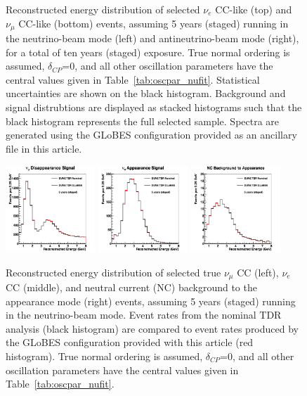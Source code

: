 \documentclass[aps,prd,superscriptaddress]{revtex4-1}
\newcommand{\nue}{\mbox{$\nu_e$}}
\newcommand{\numu}{\mbox{$\nu_{\mu}$}}
\newcommand{\dcp}{\mbox{$\delta_{CP}$}}
\begin{document}
\begin{figure}[!htpb]
  \caption{Reconstructed energy distribution of selected $\nue$ CC-like (top) and $\numu$ CC-like (bottom) events,
    assuming 5 years (staged) running in the neutrino-beam mode (left) and antineutrino-beam mode (right), for a
    total of ten years (staged) exposure. True normal ordering is assumed, $\dcp$=0, and all other oscillation
    parameters have the central values given in Table~\ref{tab:oscpar_nufit}.
    Statistical uncertainties are shown on the black histogram.
    Background and signal
    distrubtions are displayed as stacked histograms such that the black histogram represents the full selected
    sample.
    Spectra are
    generated using the GLoBES configuration provided as an ancillary file in this article. }
  \label{fig:spectra}
\end{figure}

\begin{figure}[!htpb]
  \centering
  \includegraphics[width=0.3\textwidth]{spec_checkscale_numu.png}
  \includegraphics[width=0.3\textwidth]{spec_checkscale_nue.png}
  \includegraphics[width=0.3\textwidth]{spec_checkscale_ncbg.png}
  \caption{Reconstructed energy distribution of selected true $\numu$ CC (left), $\nue$ CC (middle), and
    neutral current (NC) background to the appearance mode (right) events,
    assuming 5 years (staged) running in the neutrino-beam mode. Event rates from the nominal TDR analysis
    (black histogram) are compared to event rates produced by the GLoBES configuration provided with
    this article (red histogram). True normal ordering is assumed, $\dcp$=0, and all other oscillation
    parameters have the central values given in Table~\ref{tab:oscpar_nufit}.}
  \label{fig:speccomp}
\end{figure}
\end{document}
